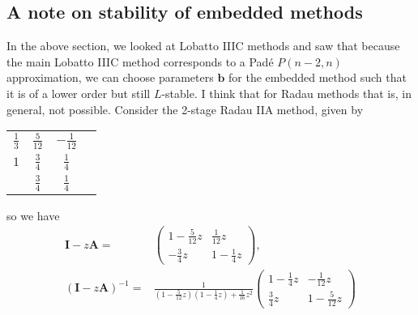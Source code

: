 \documentclass[10pt,a4paper]{article}
\newcommand{\bvec}[1]{\mathbf{#1}}
\begin{document}
\subsection{A note on stability of embedded methods}
In the above section, we looked at Lobatto IIIC methods and saw that because the main Lobatto IIIC method corresponds to a Pad\'{e} $P(n-2, n)$ approximation, we can choose parameters $\bvec{b}$ for the embedded method such that it is of a lower order but still $L$-stable.
I think that for Radau methods that is, in general, not possible.
Consider the 2-stage Radau IIA method, given by
\begin{table}[h]
  \centering
  \begin{tabular}{c|ccc}
    $\frac{1}{3}$ & $\frac{5}{12}$ & $-\frac{1}{12} $ \\
    $1$ & $\frac{3}{4}$ & $\frac{1}{4}$ \\ \hline
    {} & $\frac{3}{4}$ & $\frac{1}{4}$
  \end{tabular}
\end{table}
so we have
\begin{align*}
  \bvec{I}-z\bvec{A} =& \begin{pmatrix}
    1 - \frac{5}{12}z & \frac{1}{12}z \\
    -\frac{3}{4}z & 1 - \frac{1}{4}z
  \end{pmatrix}, \\
  (\bvec{I}-z\bvec{A})^{-1} =& \frac{1}{(1-\frac{5}{12}z)(1-\frac{1}{4}z) + \frac{1}{16}z^2}
  \begin{pmatrix}
    1 - \frac{1}{4}z & -\frac{1}{12}z \\
    \frac{3}{4}z & 1 - \frac{5}{12}z
  \end{pmatrix}
\end{align*}
\end{document}
